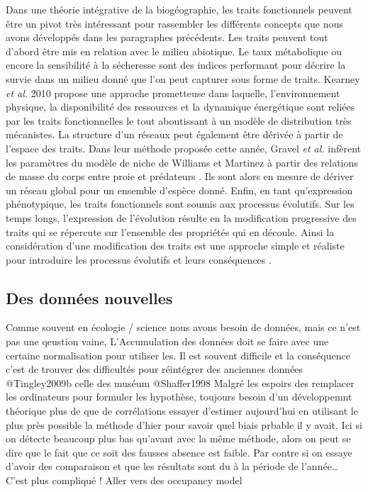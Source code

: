 Dans une théorie intégrative de la biogéographie, les traits
fonctionnels peuvent être un pivot très intéressant pour rassembler les
différents concepts que nous avons développés dans les paragraphes
précédents. Les traits peuvent tout d'abord être mis en relation avec le
milieu abiotique. Le taux métabolique ou encore la sensibilité à la
sécheresse sont des indices performant pour décrire la survie dans un
milieu donné \cite{Kearney2004,Engelbrecht2007} que l'on peut capturer
sous forme de traits. Kearney \textit{et al.} 2010 propose une approche
prometteuse dans laquelle, l'environnement physique, la disponibilité
des ressources et la dynamique énergétique sont reliées par les traits
fonctionnelles le tout aboutissant à un modèle de distribution très
mécanistes. La structure d'un réseaux peut également être dérivée à
partir de l'espace des traits. Dans leur méthode proposée cette année,
Gravel \textit{et al.} infèrent les paramètres du modèle de niche de
Williams et Martinez \cite{Williams2000} à partir des relations de masse
du corps entre proie et prédateurs \cite{Gravel2013}. Ils sont alors en
mesure de dériver un réseau global pour un ensemble d'espèce donné.
Enfin, en tant qu'expression phénotypique, les traits fonctionnels sont
soumis aux processus évolutifs. Sur les temps longs, l'expression de
l'évolution résulte en la modification progressive des traits qui se
répercute sur l'ensemble des propriétés qui en découle. Ainsi la
considération d'une modification des traits est une approche simple et
réaliste pour introduire les processus évolutifs et leurs conséquences
\cite{Guill2008,Loeuille2005}.

\subsection*{Des données nouvelles}\label{des-donnuxe9es-nouvelles}

Comme souvent en écologie / science nous avons besoin de données, mais
ce n'est pas une qeustion vaine, L'Accumulation des données doit se
faire avec une certaine normalisation pour utiliser les. Il est souvent
difficile et la conséquence c'est de trouver des difficultés pour
réintégrer des anciennes données @Tingley2009b celle des muséum
@Shaffer1998 Malgré les espoirs des remplacer les ordinateurs pour
formuler les hypothèse, toujours besoin d'un développemnt théorique plus
de que de corrélations essayer d'estimer aujourd'hui en utilisant le
plus près possible la méthode d'hier pour savoir quel biais prbable il y
avait. Ici si on détecte beaucoup plus bas qu'avant avec la même
méthode, alors on peut se dire que le fait que ce soit des fausses
absence est faible. Par contre si on essaye d'avoir des comparaison et
que les résultats sont du à la période de l'année\ldots{} C'est plus
compliqué ! Aller vers des occupancy model

